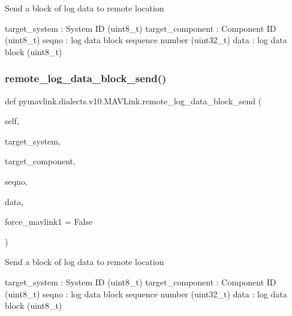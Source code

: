\begin{DoxyVerb}
\begin{DoxyVerb}
\begin{DoxyVerb}
\begin{DoxyVerb}
\begin{DoxyVerb}
\begin{DoxyVerb}
\begin{DoxyVerb}
\begin{DoxyVerb}
\begin{DoxyVerb}
\begin{DoxyVerb}
\begin{DoxyVerb}Send a block of log data to remote location

target_system             : System ID (uint8_t)
target_component          : Component ID (uint8_t)
seqno                     : log data block sequence number (uint32_t)
data                      : log data block (uint8_t)\end{DoxyVerb}
 \mbox{\label{classpymavlink_1_1dialects_1_1v10_1_1MAVLink_a208b5a1138e0916cf55eaf441b4624b6}} 
\subsubsection{\texorpdfstring{remote\+\_\+log\+\_\+data\+\_\+block\+\_\+send()}{remote\_log\_data\_block\_send()}}
{\footnotesize\ttfamily def pymavlink.\+dialects.\+v10.\+M\+A\+V\+Link.\+remote\+\_\+log\+\_\+data\+\_\+block\+\_\+send (\begin{DoxyParamCaption}\item[{}]{self,  }\item[{}]{target\+\_\+system,  }\item[{}]{target\+\_\+component,  }\item[{}]{seqno,  }\item[{}]{data,  }\item[{}]{force\+\_\+mavlink1 = {\ttfamily False} }\end{DoxyParamCaption})}

\begin{DoxyVerb}Send a block of log data to remote location

target_system             : System ID (uint8_t)
target_component          : Component ID (uint8_t)
seqno                     : log data block sequence number (uint32_t)
data                      : log data block (uint8_t)\end{DoxyVerb}
 \mbox{\label{classpymavlink_1_1dialects_1_1v10_1_1MAVLink_ae11ecd360e13dd2adefcc5d62844b6ab}} 

\end{DoxyVerb}
\end{DoxyVerb}
\end{DoxyVerb}
\end{DoxyVerb}
\end{DoxyVerb}
\end{DoxyVerb}
\end{DoxyVerb}
\end{DoxyVerb}
\end{DoxyVerb}
\end{DoxyVerb}
